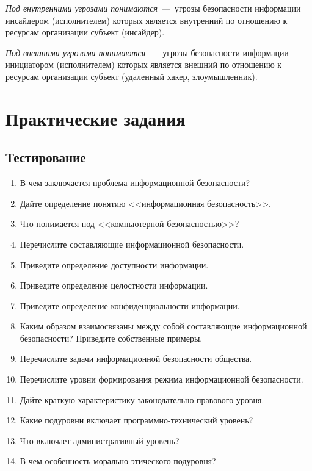 \emph{Под внутренними угрозами понимаются}~---~угрозы безопасности информации
инсайдером (исполнителем) которых является внутренний по отношению к ресурсам
организации субъект (инсайдер).

\emph{Под внешними угрозами понимаются}~---~угрозы безопасности информации
инициатором (исполнителем) которых является внешний по отношению к ресурсам
организации субъект (удаленный хакер, злоумышленник).



\section{Практические задания}\label{sect1_b}

\subsection{Тестирование}\label{sect1_b_1}
%
\begin{enumerate}
  \item В чем заключается проблема информационной безопасности?
  \item Дайте определение понятию <<информационная безопасность>>.
  \item Что понимается под <<компьютерной безопасностью>>?
  \item Перечислите составляющие информационной безопасности.
  \item Приведите определение доступности информации.
  \item Приведите определение целостности информации.
  \item Приведите определение конфиденциальности информации.
  \item Каким образом взаимосвязаны между собой составляющие информационной
      безопасности? Приведите собственные примеры.
  \item Перечислите задачи информационной безопасности общества.
  \item Перечислите уровни формирования режима информационной безопасности.
  \item Дайте краткую характеристику законодательно-правового уровня.
  \item Какие подуровни включает программно-технический уровень?
  \item Что включает административный уровень?
  \item В чем особенность морально-этического подуровня?
\end{enumerate}

